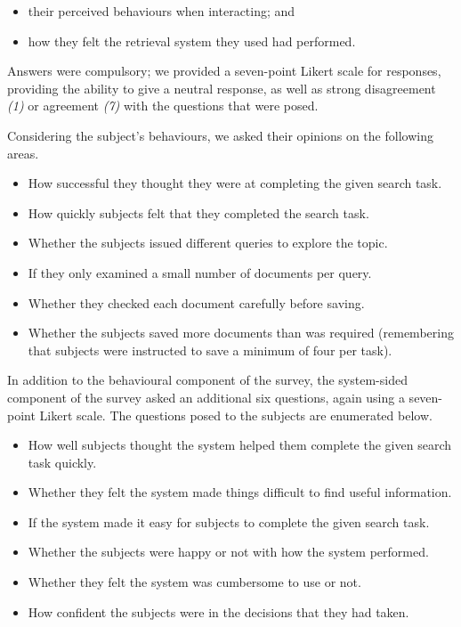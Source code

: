 \begin{itemize}
    \item{their perceived behaviours when interacting; and}
    \item{how they felt the retrieval system they used had performed.}
\end{itemize}

Answers were compulsory; we provided a seven-point Likert scale for responses, providing the ability to give a neutral response, as well as strong disagreement \emph{(1)} or agreement \emph{(7)} with the questions that were posed.

Considering the subject's behaviours, we asked their opinions on the following areas.

\begin{itemize}
    \item{ How successful they thought they were at completing the given search task.}
    \item{ How quickly subjects felt that they completed the search task.}
    \item{ Whether the subjects issued different queries to explore the topic.}
    \item{ If they only examined a small number of documents per query.}
    \item{ Whether they checked each document carefully before saving.}
    \item{ Whether the subjects saved more documents than was required (remembering that subjects were instructed to save a minimum of four per task).}
\end{itemize}

In addition to the behavioural component of the survey, the system-sided component of the survey asked an additional six questions, again using a seven-point Likert scale. The questions posed to the subjects are enumerated below.

\begin{itemize}
    \item{ How well subjects thought the system helped them complete the given search task quickly.}
    \item{ Whether they felt the system made things difficult to find useful information.}
    \item{ If the system made it easy for subjects to complete the given search task.}
    \item{ Whether the subjects were happy or not with how the system performed.}
    \item{ Whether they felt the system was cumbersome to use or not.}
    \item{ How confident the subjects were in the decisions that they had taken.}
\end{itemize}

